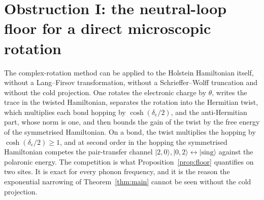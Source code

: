 \documentclass[11pt]{article}
\theoremstyle{plain}
\theoremstyle{definition}
\begin{document}
\section{Obstruction I: the neutral-loop floor for a direct microscopic rotation}\label{sec:floor}

The complex-rotation method can be applied to the Holstein Hamiltonian itself,
without a Lang--Firsov transformation, without a Schrieffer--Wolff truncation and
without the cold projection. One rotates the electronic charge by $\theta$, writes
the trace in the twisted Hamiltonian, separates the rotation into the Hermitian
twist, which multiplies each bond hopping by $\cosh(\delta_e/2)$, and the
anti-Hermitian part, whose norm is one, and then bounds the gain of the twist by
the free energy of the symmetrised Hamiltonian. On a bond, the twist multiplies the
hopping by $\cosh(\delta_e/2)\ge1$, and at second order in the hopping the
symmetrised Hamiltonian competes the pair-transfer channel $|2,0\rangle,
|0,2\rangle\leftrightarrow|\mathrm{sing}\rangle$ against the polaronic energy. The
competition is what Proposition~\ref{prop:floor} quantifies on two sites. It is
exact for every phonon frequency, and it is the reason the exponential narrowing
of Theorem~\ref{thm:main} cannot be seen without the cold projection.
\end{document}
